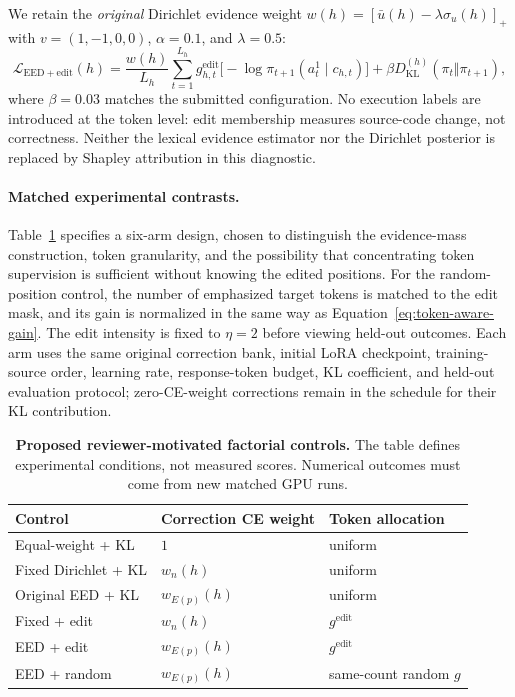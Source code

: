 We retain the \emph{original} Dirichlet evidence weight
$w(h)=[\bar u(h)-\lambda\sigma_u(h)]_+$
with $v=(1,-1,0,0)$, $\alpha=0.1$, and $\lambda=0.5$:
\begin{equation}
\mathcal L_{\mathrm{EED+edit}}(h)
=\frac{w(h)}{L_h}\sum_{t=1}^{L_h}
g_{h,t}^{\mathrm{edit}}\bigl[-\log\pi_{t+1}
(a^1_t\mid c_{h,t})\bigr]
+\beta D_{\mathrm{KL}}^{(h)}(\pi_t\Vert\pi_{t+1}),
\label{eq:token-aware-objective}
\end{equation}
where $\beta=0.03$ matches the submitted configuration.
No execution labels are introduced at the token level:
edit membership measures source-code change, not correctness.
Neither the lexical evidence estimator nor the Dirichlet
posterior is replaced by Shapley attribution in this diagnostic.

\paragraph{Matched experimental contrasts.}
Table~\ref{tab:token-aware-protocol} specifies a six-arm design,
chosen to distinguish the evidence-mass construction, token
granularity, and the possibility that concentrating token supervision
is sufficient without knowing the edited positions.
For the random-position control, the number of emphasized target
tokens is matched to the edit mask, and its gain is normalized in
the same way as Equation~\ref{eq:token-aware-gain}.
The edit intensity is fixed to $\eta=2$ before viewing
held-out outcomes. Each arm uses the same original correction
bank, initial LoRA checkpoint, training-source order, learning
rate, response-token budget, KL coefficient, and held-out
evaluation protocol; zero-CE-weight corrections remain in the
schedule for their KL contribution.

\begin{table}[t]
\centering
\small
\caption{\textbf{Proposed reviewer-motivated factorial controls.}
The table defines experimental conditions, not measured scores.
Numerical outcomes must come from new matched GPU runs.}
\label{tab:token-aware-protocol}
\setlength{\tabcolsep}{5pt}
\begin{tabular}{lll}
\toprule
Control & Correction CE weight & Token allocation\\
\midrule
Equal-weight + KL & $1$ & uniform\\
Fixed Dirichlet + KL & $w_n(h)$ & uniform\\
Original EED + KL & $w_{E(p)}(h)$ & uniform\\
Fixed + edit & $w_n(h)$ & $g^{\mathrm{edit}}$\\
EED + edit & $w_{E(p)}(h)$ & $g^{\mathrm{edit}}$\\
EED + random & $w_{E(p)}(h)$ & same-count random $g$\\
\bottomrule
\end{tabular}
\end{table}

